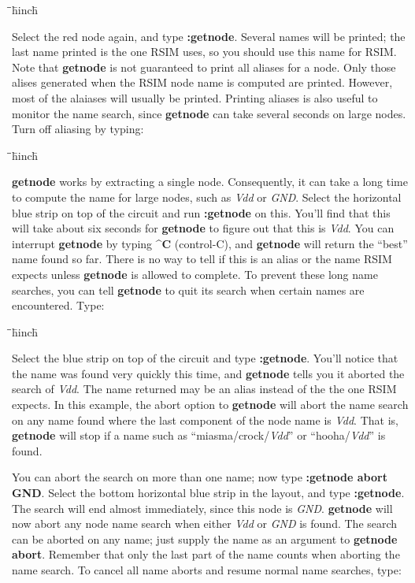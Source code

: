 \documentclass[letterpaper,twoside,12pt]{article}
\def\hinch{\hspace*{0.5in}}
\def\starti{\begin{center}\begin{tabbing}\hinch\=\hinch\=\hinch\=hinch\hinch\=\kill}
\def\endi{\end{tabbing}\end{center}}
\def\ii{\>\>\>}
\begin{document}
\starti
   \ii {\bfseries :getnode alias on}
\endi

Select the red node again, and type {\bfseries :getnode}.  Several names will
be printed; the last name printed is the one RSIM uses, so you should use 
this name for RSIM.  
Note that {\bfseries getnode} is not guaranteed to print all aliases for a node.
Only those alises generated when the RSIM node name is computed are printed.
However, most of the alaiases will usually be printed.
Printing aliases is also useful to monitor the name search, since
{\bfseries getnode} can take several seconds on large nodes.  Turn off aliasing
by typing:

\starti
   \ii {\bfseries :getnode alias off}
\endi

{\bfseries getnode} works by extracting a single node.  Consequently, it can take
a long time to compute the name for large nodes, such as {\itshape Vdd} or
{\itshape GND}.  Select the horizontal blue strip on top of the circuit and
run {\bfseries :getnode} on this.  You'll find that this will take about six 
seconds for {\bfseries getnode} to figure out that this is {\itshape Vdd}.  You can
interrupt {\bfseries getnode} by typing {\bfseries \^{}C} (control-C), and {\bfseries getnode} will
return the ``best'' name found so far.  There is no way to tell if this
is an alias or the name RSIM expects unless {\bfseries getnode} is allowed
to complete.  To prevent these long name searches, you can tell {\bfseries getnode}
to quit its search when certain names are encountered.  Type:

\starti
   \ii {\bfseries :getnode abort Vdd}
\endi

Select the blue strip on top of the circuit and type {\bfseries :getnode}.
You'll notice that the name was found very quickly this time, and {\bfseries getnode}
tells you it aborted the search of {\itshape Vdd}.  
The name returned may be an alias instead of the the one RSIM expects.  
In this example, the abort option to {\bfseries getnode}
will abort the name search on any name found where the last component of
the node name is {\itshape Vdd}.  That is, {\bfseries getnode} will stop if a name such as
``miasma/crock/{\itshape Vdd}'' or ``hooha/{\itshape Vdd}'' is found.  

You can abort the 
search on more than one name; now type {\bfseries :getnode abort GND}.  Select the
bottom horizontal blue strip in the layout, and type {\bfseries :getnode}.  The
search will end almost immediately, since this node is {\itshape GND}.  
{\bfseries getnode} will now abort any node name search when either {\itshape Vdd}
or {\itshape GND} is found.  The search can be aborted on any name; just
supply the name as an argument to {\bfseries getnode abort}.
Remember that only the last part of the name counts when aborting
the name search.  To cancel all name aborts and resume normal name
searches, type:
\end{document}
